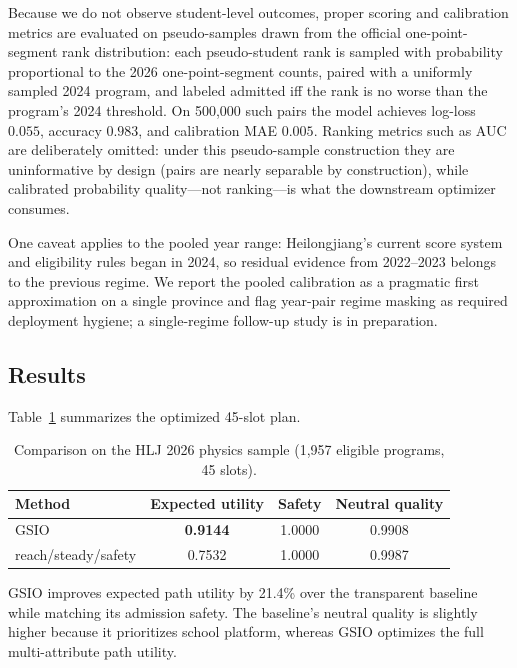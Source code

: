 \documentclass[11pt,a4paper]{article}
\begin{document}
Because we do not observe student-level outcomes, proper scoring and calibration metrics are evaluated on pseudo-samples drawn from the official one-point-segment rank distribution: each pseudo-student rank is sampled with probability proportional to the 2026 one-point-segment counts, paired with a uniformly sampled 2024 program, and labeled admitted iff the rank is no worse than the program's 2024 threshold. On 500,000 such pairs the model achieves log-loss $0.055$, accuracy $0.983$, and calibration MAE $0.005$. Ranking metrics such as AUC are deliberately omitted: under this pseudo-sample construction they are uninformative by design (pairs are nearly separable by construction), while calibrated probability quality---not ranking---is what the downstream optimizer consumes.

One caveat applies to the pooled year range: Heilongjiang's current score system and eligibility rules began in 2024, so residual evidence from 2022--2023 belongs to the previous regime. We report the pooled calibration as a pragmatic first approximation on a single province and flag year-pair regime masking as required deployment hygiene; a single-regime follow-up study is in preparation.

\subsection{Results}

Table~\ref{tab:main} summarizes the optimized 45-slot plan.

\begin{table}[H]
  \centering
  \caption{Comparison on the HLJ 2026 physics sample (1,957 eligible programs, 45 slots).}
  \label{tab:main}
  \begin{tabular}{lccc}
    \toprule
    Method & Expected utility & Safety & Neutral quality \\
    \midrule
    GSIO & \textbf{0.9144} & 1.0000 & 0.9908 \\
    reach/steady/safety & 0.7532 & 1.0000 & 0.9987 \\
    \bottomrule
  \end{tabular}
\end{table}

GSIO improves expected path utility by 21.4\% over the transparent baseline while matching its admission safety. The baseline's neutral quality is slightly higher because it prioritizes school platform, whereas GSIO optimizes the full multi-attribute path utility.
\end{document}
